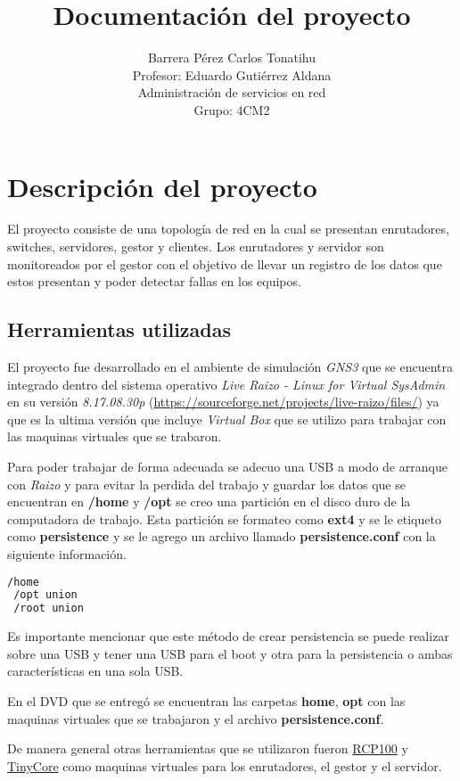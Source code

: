 \documentclass[a4paper,12pt]{article}
\title{}
\title{Documentación del proyecto}
\author{Barrera Pérez Carlos Tonatihu \\ Profesor: Eduardo Gutiérrez Aldana \\ Administración de servicios en red \\ Grupo: 4CM2 }
\begin{document}
\maketitle
\newpage
\tableofcontents
\newpage

\section{Descripción del proyecto}
El proyecto consiste de una topología de red en la cual se presentan enrutadores, switches, servidores, gestor y clientes. Los enrutadores y servidor son monitoreados por el gestor con el objetivo de llevar un registro de los datos que estos presentan y poder detectar fallas en los equipos.

\subsection{Herramientas utilizadas}
El proyecto fue desarrollado en el ambiente de simulación \emph{GNS3} que se encuentra integrado dentro del sistema operativo \emph{Live Raizo - Linux for Virtual SysAdmin} en su versión \emph{8.17.08.30p} (\url{https://sourceforge.net/projects/live-raizo/files/}) ya que es la ultima versión que incluye \emph{Virtual Box} que se utilizo para trabajar con las maquinas virtuales que se trabaron.

Para poder trabajar de forma adecuada se adecuo una USB a modo de arranque con \emph{Raizo} y para evitar la perdida del trabajo y guardar los datos que se encuentran en \textbf{/home} y \textbf{/opt} se creo una partición en el disco duro de la computadora de trabajo. Esta partición se formateo como \textbf{ext4} y se le etiqueto como \textbf{persistence} y se le agrego un archivo llamado \textbf{persistence.conf} con la siguiente información.

\begin{lstlisting}[language=bash]
 /home
 /opt union
 /root union
\end{lstlisting}

Es importante mencionar que este método de crear persistencia se puede realizar sobre una USB y tener una USB para el boot y otra para la persistencia o ambas características en una sola USB.

En el DVD que se entregó se encuentran las carpetas \textbf{home}, \textbf{opt} con las maquinas virtuales que se trabajaron y el archivo \textbf{persistence.conf}.

De manera general otras herramientas que se utilizaron fueron \href{http://rcp100.sourceforge.net/}{RCP100} y \href{https://distro.ibiblio.org/tinycorelinux/}{TinyCore} como maquinas virtuales para los enrutadores, el gestor y el servidor.
\end{document}
